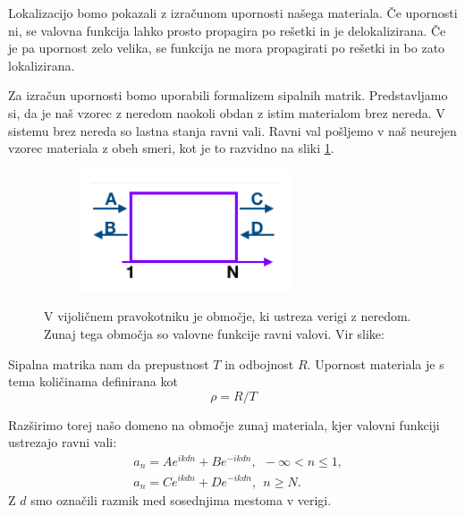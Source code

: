 \begin{appendices}
Lokalizacijo bomo pokazali z izračunom upornosti našega materiala. Če upornosti ni, se valovna funkcija lahko prosto propagira po rešetki in je delokalizirana. Če je pa upornost zelo velika, se funkcija ne mora propagirati po rešetki in bo zato lokalizirana.

Za izračun upornosti bomo uporabili formalizem sipalnih matrik. Predstavljamo si, da je naš vzorec z neredom naokoli obdan z istim materialom  brez nereda. V sistemu brez nereda so lastna stanja ravni vali. Ravni val pošljemo v naš neurejen vzorec materiala z obeh smeri, kot je to razvidno na sliki \ref{fig:Sipanje}.
\begin{figure}[H]
\centering
\begin{subfigure}{\textwidth}
\includegraphics[width=\linewidth]{Figures/Sipanje.pdf}
\end{subfigure}
\caption{V vijoličnem pravokotniku je območje, ki ustreza verigi z neredom. Zunaj tega območja so valovne funkcije ravni valovi. Vir slike: \cite{anderson}}
\label{fig:Sipanje}
\end{figure}

Sipalna matrika nam da prepustnost $T$ in odbojnost $R$. Upornost materiala je s tema količinama definirana kot
\begin{equation}
\rho = R/T
\end{equation}

Razširimo torej našo domeno na območje zunaj materiala, kjer valovni funkciji ustrezajo ravni vali:
\begin{align}
&a_n = A e^{i k d n} + B e^{-i k d n}, \ \ - \infty < n \leq 1, \\
&a_n = C e^{ikdn} + D e^{- ik d n},  \ \ n \geq N.
\end{align}
Z $d$ smo označili razmik med sosednjima mestoma v verigi.


\end{appendices}
